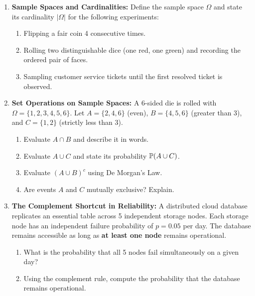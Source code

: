\begin{enumerate}
    \item \textbf{Sample Spaces and Cardinalities:} Define the sample space $\Omega$ and state its cardinality $|\Omega|$ for the following experiments:
    \begin{enumerate}
        \item Flipping a fair coin 4 consecutive times.
        \item Rolling two distinguishable dice (one red, one green) and recording the ordered pair of faces.
        \item Sampling customer service tickets until the first resolved ticket is observed.
    \end{enumerate}

    \item \textbf{Set Operations on Sample Spaces:} A 6-sided die is rolled with $\Omega = \{1, 2, 3, 4, 5, 6\}$.
    Let $A = \{2, 4, 6\}$ (even), $B = \{4, 5, 6\}$ (greater than 3), and $C = \{1, 2\}$ (strictly less than 3).
    \begin{enumerate}
        \item Evaluate $A \cap B$ and describe it in words.
        \item Evaluate $A \cup C$ and state its probability $\P(A \cup C)$.
        \item Evaluate $(A \cup B)^c$ using De Morgan's Law.
        \item Are events $A$ and $C$ mutually exclusive? Explain.
    \end{enumerate}

    \item \textbf{The Complement Shortcut in Reliability:} A distributed cloud database replicates an essential table across 5 independent storage nodes. Each storage node has an independent failure probability of $p = 0.05$ per day. The database remains accessible as long as \textbf{at least one node} remains operational.
    \begin{enumerate}
        \item What is the probability that all 5 nodes fail simultaneously on a given day?
        \item Using the complement rule, compute the probability that the database remains operational.
    \end{enumerate}


\end{enumerate}
